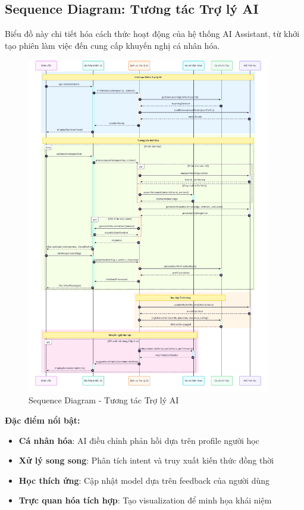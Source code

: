 \subsection{Sequence Diagram: Tương tác Trợ lý AI}
\label{subsec:ai-assistant-sequence}

Biểu đồ này chi tiết hóa cách thức hoạt động của hệ thống AI Assistant, từ khởi tạo phiên làm việc đến cung cấp khuyến nghị cá nhân hóa.

\begin{figure}[H]
\centering
\includegraphics[width=0.95\textwidth]{images/sequence-ai-assistant.png}
\caption{Sequence Diagram - Tương tác Trợ lý AI}
\label{fig:sequence-ai-assistant}
\end{figure}

\textbf{Đặc điểm nổi bật:}
\begin{itemize}
    \item \textbf{Cá nhân hóa}: AI điều chỉnh phản hồi dựa trên profile người học
    \item \textbf{Xử lý song song}: Phân tích intent và truy xuất kiến thức đồng thời
    \item \textbf{Học thích ứng}: Cập nhật model dựa trên feedback của người dùng
    \item \textbf{Trực quan hóa tích hợp}: Tạo visualization để minh họa khái niệm
\end{itemize}


